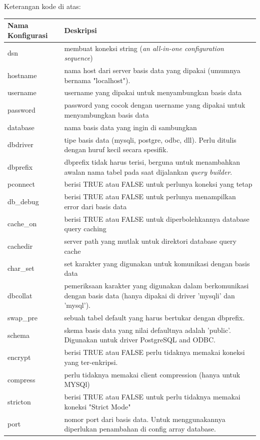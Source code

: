 	Keterangan kode di atas:
	\begin{center}
	\begin{tabular}{| m{5cm} | m{10cm} |}
		\hline
		Nama Konfigurasi & Deskripsi\\
		\hline
		dsn & membuat koneksi string  (\textit{an all-in-one configuration sequence})\\
		\hline
		hostname & nama host dari server basis data yang dipakai (umumnya bernama "localhost").\\
		\hline
		username & username yang dipakai untuk menyambungkan basis data\\
		\hline
		password & password yang cocok dengan username yang dipakai untuk menyambungkan basis data\\
		\hline
		database & nama basis data yang ingin di sambungkan\\
		\hline
		dbdriver & tipe basis data (mysqli, postgre, odbc, dll). Perlu ditulis dengan huruf kecil secara spesifik.\\
		\hline
		dbprefix & dbprefix tidak harus terisi, berguna untuk menambahkan awalan nama tabel pada saat dijalankan \textit{query builder}.\\
		\hline
		pconnect & berisi TRUE atau FALSE untuk perlunya koneksi yang tetap\\
		\hline
		db\_debug & berisi TRUE atau FALSE untuk perlunya menampilkan error dari basis data\\
		\hline
		cache\_on & berisi TRUE atau FALSE untuk diperbolehkannya database query caching\\
		\hline
		cachedir & server path yang mutlak untuk direktori database query cache\\
		\hline
		char\_set & set karakter yang digunakan untuk komunikasi dengan basis data\\
		\hline
		dbcollat & pemeriksaan karakter yang digunakan dalam berkomunikasi dengan basis data (hanya dipakai di driver 'mysqli' dan 'mysql').\\
		\hline
		swap\_pre & sebuah tabel default yang harus bertukar dengan dbprefix.\\
		\hline
		schema & skema basis data yang nilai defaultnya adalah 'public'. Digunakan untuk driver PostgreSQL and ODBC.\\
		\hline
		encrypt &  berisi TRUE atau FALSE perlu tidaknya memakai koneksi yang ter-enkripsi.\\
		\hline
		compress & perlu tidaknya memakai client compression (hanya untuk MYSQl)\\
		\hline
		stricton &  berisi TRUE atau FALSE untuk perlu tidaknya memakai koneksi "Strict Mode" \\
		\hline
		port & nomor port dari basis data. Untuk menggunakannya diperlukan penambahan di config array database.\\
		\hline
	\end{tabular}
\end{center}
	
